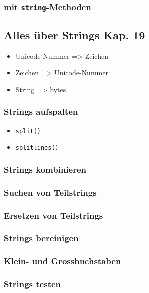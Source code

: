 \subsubsection{mit \texttt{string}-Methoden}


\subsection{Alles über Strings \tiny{Kap. 19}}
\begin{itemize}
	\item Unicode-Nummer => Zeichen
	
	\item Zeichen => Unicode-Nummer
	
	\item String => bytes
	
\end{itemize}

\subsubsection{Strings aufspalten}
\begin{itemize}
	\item \texttt{split()}
	
	\item \texttt{splitlines()}
	
\end{itemize}

\subsubsection{Strings kombinieren}


\subsubsection{Suchen von Teilstrings}


\subsubsection{Ersetzen von Teilstrings}


\subsubsection{Strings bereinigen}


\subsubsection{Klein- und Grossbuchstaben}


\subsubsection{Strings testen}
